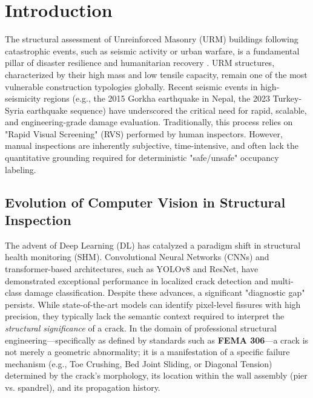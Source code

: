\section{Introduction}
\label{sec:introduction}

\begin{sloppypar}
The structural assessment of Unreinforced Masonry (URM) buildings following catastrophic events, such as seismic activity or urban warfare, is a fundamental pillar of disaster resilience and humanitarian recovery \cite{cervenka2020computer}. URM structures, characterized by their high mass and low tensile capacity, remain one of the most vulnerable construction typologies globally. Recent seismic events in high-seismicity regions (e.g., the 2015 Gorkha earthquake in Nepal, the 2023 Turkey-Syria earthquake sequence) have underscored the critical need for rapid, scalable, and engineering-grade damage evaluation. Traditionally, this process relies on "Rapid Visual Screening" (RVS) performed by human inspectors. However, manual inspections are inherently subjective, time-intensive, and often lack the quantitative grounding required for deterministic "safe/unsafe" occupancy labeling. 
\end{sloppypar}

\subsection{Evolution of Computer Vision in Structural Inspection}
\begin{sloppypar}
The advent of Deep Learning (DL) has catalyzed a paradigm shift in structural health monitoring (SHM). Convolutional Neural Networks (CNNs) and transformer-based architectures, such as YOLOv8 and ResNet, have demonstrated exceptional performance in localized crack detection and multi-class damage classification. Despite these advances, a significant "diagnostic gap" persists. While state-of-the-art models can identify pixel-level fissures with high precision, they typically lack the semantic context required to interpret the \textit{structural significance} of a crack. In the domain of professional structural engineering—specifically as defined by standards such as \textbf{FEMA 306}—a crack is not merely a geometric abnormality; it is a manifestation of a specific failure mechanism (e.g., Toe Crushing, Bed Joint Sliding, or Diagonal Tension) determined by the crack's morphology, its location within the wall assembly (pier vs. spandrel), and its propagation history.
\end{sloppypar}

